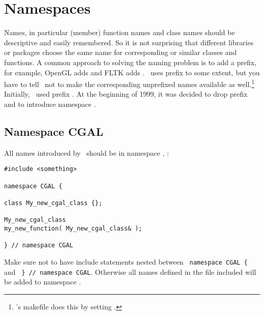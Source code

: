 
\chapter{Namespaces\label{chap:namespaces}}

Names, in particular (member) function names and class names should 
be descriptive and easily remembered. So it is not surprising that
different libraries or packages choose the same name for corresponding
or similar classes and functions. A common approach to solving the
naming problem is to add a prefix, for example, 
OpenGL adds 
and FLTK adds . \leda\ uses prefix %
to some extent, 
but you have to tell \leda\ not to make the corresponding unprefixed names 
available as well.\footnote{\cgal's
makefile does this by setting .} Initially, \cgal\ used
prefix . 
At the beginning of 1999, it was decided to drop prefix  and to 
introduce namespace . 

\section{Namespace CGAL}
All names introduced by \cgal\ should be in namespace , \eg: 
\begin{verbatim}
#include <something>

namespace CGAL {

class My_new_cgal_class {};

My_new_cgal_class 
my_new_function( My_new_cgal_class& );

} // namespace CGAL
\end{verbatim}
Make sure not to have include statements nested between 
\verb+ namespace CGAL { + and \verb+ } // namespace CGAL+.
Otherwise all names defined in the file included will be 
added to namespace .


